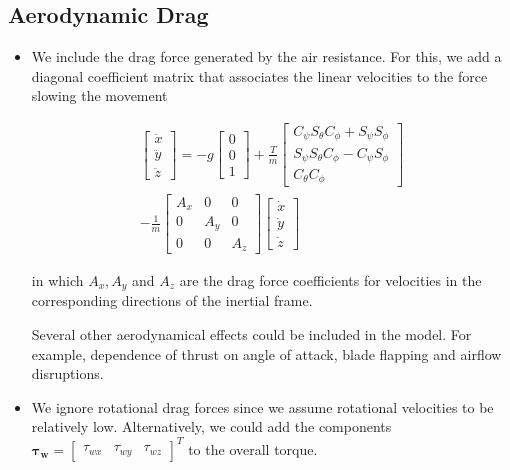 \subsection{Aerodynamic Drag}

\begin{itemize}

  \item We include the drag force generated by the air resistance. For this, we add a diagonal coefficient matrix that associates the linear velocities to the force slowing the movement

  $$
    \begin{array}{l}
      \left[ \begin{array}{l}{\ddot{x}} \\ {\ddot{y}} \\ {\ddot{z}}\end{array}\right]=-g \left[ \begin{array}{l}{0} \\ {0} \\ {1}\end{array}\right]+\frac{T}{m} \left[ \begin{array}{c}{C_{\psi} S_{\theta} C_{\phi}+S_{\psi} S_{\phi}} \\ {S_{\psi} S_{\theta} C_{\phi}-C_{\psi} S_{\phi}} \\ {C_{\theta} C_{\phi}}\end{array}\right] \\
      - \frac{1}{m} \left[ \begin{array}{ccc}{A_{x}} & {0} & {0} \\ {0} & {A_{y}} & {0} \\ {0} & {0} & {A_{z}}\end{array}\right] \left[ \begin{array}{c}{\dot{x}} \\ {\dot{y}} \\ {\dot{z}}\end{array}\right]
    \end{array}
  $$

  in which $A_{x}, A_{y}$ and $A_{z}$ are the drag force coefficients for velocities in the corresponding directions of the inertial frame.

  Several other aerodynamical effects could be included in the model. For example,
dependence of thrust on angle of attack, blade flapping and airflow disruptions.

  \item We ignore rotational drag forces since we assume rotational velocities to be relatively low. Alternatively,
   we could add the components $\boldsymbol{\tau}_{\boldsymbol{w}}=\left[ \begin{array}{lll}{\tau_{w x}} & {\tau_{w y}} & {\tau_{w z}}\end{array}\right]^{T}$ to the overall torque.

\end{itemize}

